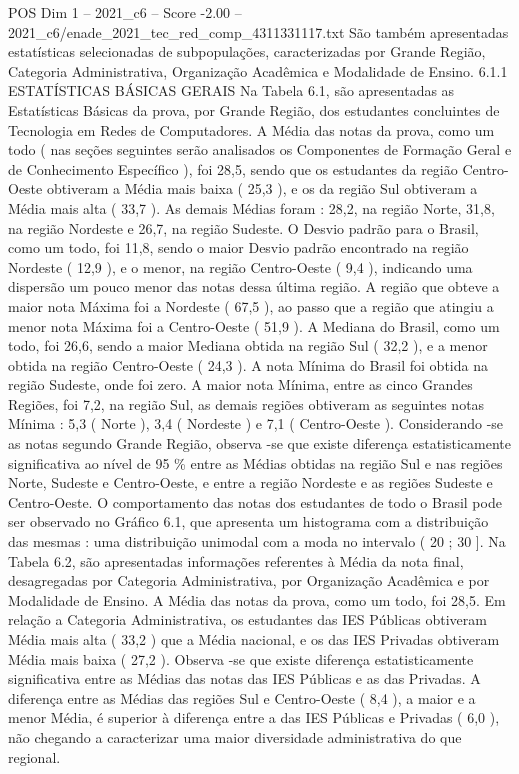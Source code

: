 \begin{textsample}{POS Dim 1 – 2021\_c6 – Score -2.00 – 2021\_c6/enade\_2021\_tec\_red\_comp\_4311331117.txt}
São também apresentadas estatísticas selecionadas de subpopulações, caracterizadas por Grande Região, Categoria Administrativa, Organização Acadêmica e Modalidade de Ensino. 6.1.1 ESTATÍSTICAS BÁSICAS GERAIS Na Tabela 6.1, são apresentadas as Estatísticas Básicas da prova, por Grande Região, dos estudantes concluintes de Tecnologia em Redes de Computadores.
A Média das notas da prova, como um todo ( nas seções seguintes serão analisados os Componentes de Formação Geral e de Conhecimento Específico ), foi 28,5, sendo que os estudantes da região Centro-Oeste obtiveram a Média mais baixa ( 25,3 ), e os da região Sul obtiveram a Média mais alta ( 33,7 ).
As demais Médias foram : 28,2, na região Norte, 31,8, na região Nordeste e 26,7, na região Sudeste.
O Desvio padrão para o Brasil, como um todo, foi 11,8, sendo o maior Desvio padrão encontrado na região Nordeste ( 12,9 ), e o menor, na região Centro-Oeste ( 9,4 ), indicando uma dispersão um pouco menor das notas dessa última região.
A região que obteve a maior nota Máxima foi a Nordeste ( 67,5 ), ao passo que a região que atingiu a menor nota Máxima foi a Centro-Oeste ( 51,9 ).
A Mediana do Brasil, como um todo, foi 26,6, sendo a maior Mediana obtida na região Sul ( 32,2 ), e a menor obtida na região Centro-Oeste ( 24,3 ).
A nota Mínima do Brasil foi obtida na região Sudeste, onde foi zero.
A maior nota Mínima, entre as cinco Grandes Regiões, foi 7,2, na região Sul, as demais regiões obtiveram as seguintes notas Mínima : 5,3 ( Norte ), 3,4 ( Nordeste ) e 7,1 ( Centro-Oeste ).
Considerando -se as notas segundo Grande Região, observa -se que existe diferença estatisticamente significativa ao nível de 95 \% entre as Médias obtidas na região Sul e nas regiões Norte, Sudeste e Centro-Oeste, e entre a região Nordeste e as regiões Sudeste e Centro-Oeste.
O comportamento das notas dos estudantes de todo o Brasil pode ser observado no Gráfico 6.1, que apresenta um histograma com a distribuição das mesmas : uma distribuição unimodal com a moda no intervalo ( 20 ; 30 ].
Na Tabela 6.2, são apresentadas informações referentes à Média da nota final, desagregadas por Categoria Administrativa, por Organização Acadêmica e por Modalidade de Ensino.
A Média das notas da prova, como um todo, foi 28,5.
Em relação a Categoria Administrativa, os estudantes das IES Públicas obtiveram Média mais alta ( 33,2 ) que a Média nacional, e os das IES Privadas obtiveram Média mais baixa ( 27,2 ).
Observa -se que existe diferença estatisticamente significativa entre as Médias das notas das IES Públicas e as das Privadas.
A diferença entre as Médias das regiões Sul e Centro-Oeste ( 8,4 ), a maior e a menor Média, é superior à diferença entre a das IES Públicas e Privadas ( 6,0 ), não chegando a caracterizar uma maior diversidade administrativa do que regional.

\end{textsample}
